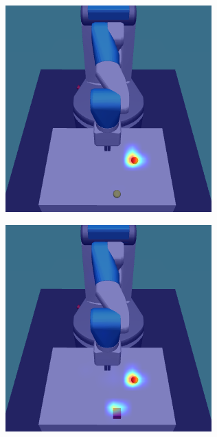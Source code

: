 \begin{figure}
\begin{subfigure}{0.24\columnwidth}
  \end{subfigure}
  \begin{subfigure}{0.24\columnwidth}
    \includegraphics[width=\linewidth]{figures/chapter6/distractor_saliency_fetch_pro_on/color_sensor_random}
  \end{subfigure}
  \begin{subfigure}{0.24\columnwidth}
    \includegraphics[width=\linewidth]{figures/chapter6/distractor_saliency_fetch_pro_on/shape_sensor_random}

\end{subfigure}
\end{figure}
